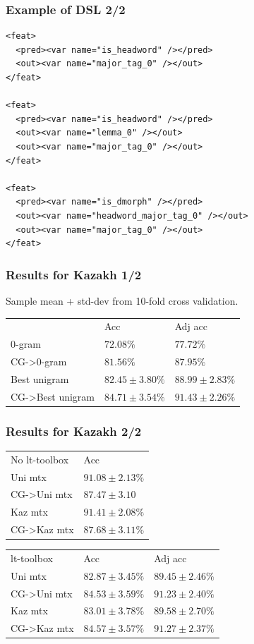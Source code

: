 \documentclass{beamer}
\begin{document}
\begin{frame}[fragile]
\frametitle{Example of DSL 2/2}
{\scriptsize
\begin{verbatim}
<feat>
  <pred><var name="is_headword" /></pred>
  <out><var name="major_tag_0" /></out>
</feat>

<feat>
  <pred><var name="is_headword" /></pred>
  <out><var name="lemma_0" /></out>
  <out><var name="major_tag_0" /></out>
</feat>

<feat>
  <pred><var name="is_dmorph" /></pred>
  <out><var name="headword_major_tag_0" /></out>
  <out><var name="major_tag_0" /></out>
</feat>
\end{verbatim}
}

\end{frame}

\begin{frame}
\frametitle{Results for Kazakh 1/2}

Sample mean + std-dev from 10-fold cross validation.

\begin{table}
\begin{tabular}{ l | l l }
  & Acc & Adj acc \\
  0-gram & $72.08\%$ & $77.72\%$  \\
  CG->0-gram & $81.56\%$ & $ 87.95\%$ \\
  Best unigram & $82.45\pm3.80\%$ & $88.99\pm2.83\%$ \\
  CG->Best unigram & $84.71\pm3.54\%$ & $91.43\pm2.26\%$
\end{tabular}
\end{table}

\end{frame}

\begin{frame}
\frametitle{Results for Kazakh 2/2}

\begin{table}
\begin{tabular}{ l | l }
  No lt-toolbox & Acc\\
  Uni mtx & $91.08\pm2.13\%$\\
  CG->Uni mtx & $87.47\pm3.10$ \\
  Kaz mtx & $91.41\pm2.08\%$ \\
  CG->Kaz mtx & $87.68\pm3.11\%$
\end{tabular}
\end{table}

\begin{table}
\begin{tabular}{ l | l l }
  lt-toolbox & Acc & Adj acc\\
  Uni mtx & $82.87\pm3.45\%$ & $89.45\pm2.46\%$ \\
  CG->Uni mtx & $84.53\pm3.59\%$ & $91.23\pm2.40\%$\\
  Kaz mtx & $83.01\pm3.78\%$ & $89.58\pm2.70\%$ \\
  CG->Kaz mtx & $84.57\pm3.57\%$ & $91.27\pm2.37\%$
\end{tabular}
\end{table}

\end{frame}
\end{document}

